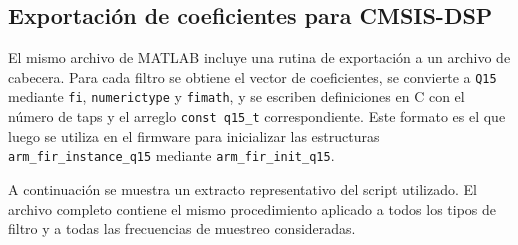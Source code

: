 \documentclass[12pt]{article}
\begin{document}
	\subsection{Exportación de coeficientes para CMSIS-DSP}
	
	El mismo archivo de MATLAB incluye una rutina de exportación a un archivo de cabecera. Para cada filtro se obtiene el vector de coeficientes, se convierte a \texttt{Q15} mediante \texttt{fi}, \texttt{numerictype} y \texttt{fimath}, y se escriben definiciones en C con el número de taps y el arreglo \texttt{const q15\_t} correspondiente. Este formato es el que luego se utiliza en el firmware para inicializar las estructuras \texttt{arm\_fir\_instance\_q15} mediante \texttt{arm\_fir\_init\_q15}.
	
	A continuación se muestra un extracto representativo del script utilizado. El archivo completo contiene el mismo procedimiento aplicado a todos los tipos de filtro y a todas las frecuencias de muestreo consideradas.
	
\end{document}
